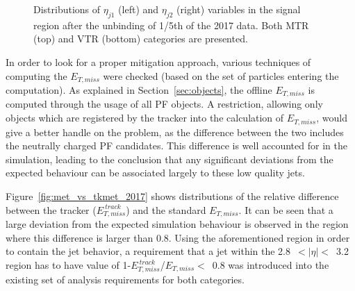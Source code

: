 \begin{figure}[htbp]
{    }
  \caption{Distributions of $\eta_{j1}$ (left) and $\eta_{j2}$ (right) variables in the signal region after the unbinding of 1/5th of the 2017 data. Both MTR (top) and VTR (bottom) categories are presented.}
  \label{fig:jet_eta_preHornCut}
\end{figure}




\hspace{10pt} In order to look for a proper mitigation approach, various techniques of computing the $E_{T, miss}$ were checked (based on the set of particles entering the computation). As explained in Section~\ref{sec:objects}, the offline $E_{T,miss}$ is computed through the usage of all PF objects. A restriction, allowing only objects which are registered by the tracker into the calculation of $E_{T,miss}$, would give a better handle on the problem, as the difference between the two includes the neutrally charged PF candidates. This difference is well accounted for in the simulation, leading to the conclusion that any significant deviations from the expected behaviour can be associated largely to these low quality jets.

\hspace{10pt} Figure~\ref{fig:met_vs_tkmet_2017} shows distributions of the relative difference between the tracker ($E_{T,miss}^{~track}$) and the standard $E_{T, miss}$. It can be seen that a large deviation from the expected simulation behaviour is observed in the region where this difference is larger than 0.8. Using the aforementioned region in order to contain the jet behavior, a requirement that a jet within the 2.8~$<|\eta|<$~3.2 region has to have value of 1-$E_{T,miss}^{~track}$/$E_{T, miss}<$~0.8  was introduced into the existing set of analysis requirements for both categories.

